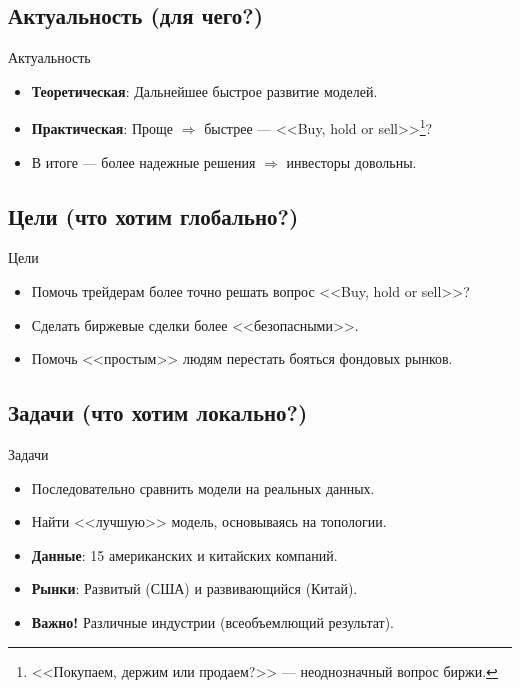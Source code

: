 \documentclass[11pt, aspectratio= 169]{beamer}
\begin{document}
	\subsection{Актуальность (для чего?)}
	\begin{frame}{Актуальность}
		\Large
		\begin{itemize}
			\item \textbf{Теоретическая}: Дальнейшее быстрое развитие моделей.
			\item \textbf{Практическая}: Проще $\Rightarrow$ быстрее --- <<Buy, hold or sell>>\footnote{<<Покупаем, держим или продаем?>> --- неоднозначный вопрос биржи.}?
			\item[] В итоге --- более надежные решения $\Rightarrow$ инвесторы довольны.
		\end{itemize}
	\end{frame}
	
	\subsection{Цели (что хотим глобально?)}
	\begin{frame}{Цели}
		\Large
		\begin{itemize}
			\item Помочь трейдерам более точно решать вопрос <<Buy, hold or sell>>?
			\item Сделать биржевые сделки более <<безопасными>>.
			\item Помочь <<простым>> людям перестать бояться фондовых рынков.
		\end{itemize}
	\end{frame}
	
	\subsection{Задачи (что хотим локально?)}
	\begin{frame}{Задачи}
		\Large
		\begin{itemize}
			\item Последовательно сравнить модели на реальных данных.
			\item Найти <<лучшую>> модель, основываясь на топологии.
			\item \textbf{Данные}: 15 американских и китайских компаний.
			\item[] \textbf{Рынки}: Развитый (США) и развивающийся (Китай).
			\item[] \textbf{Важно!} Различные индустрии (всеобъемлющий результат). 
		\end{itemize}
	\end{frame}
	
\end{document}
